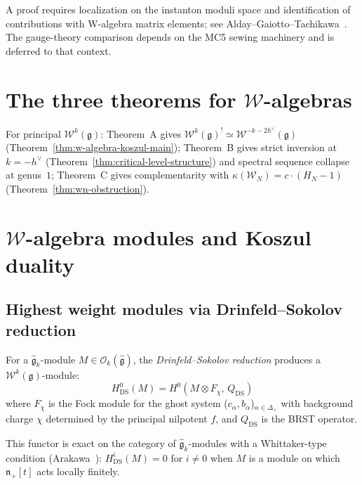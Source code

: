 \begin{remark}
A proof requires localization on the instanton moduli space and identification of contributions with W-algebra matrix elements; see Alday--Gaiotto--Tachikawa~\cite{AGT09}.  The gauge-theory comparison depends on the MC5 sewing machinery and is deferred to that context.
\end{remark}


\section{The three theorems for $\mathcal{W}$-algebras}

\begin{remark}
\label{rem:w-algebra-three-theorems}
For principal $\mathcal{W}^k(\mathfrak{g})$:
Theorem~A gives $\mathcal{W}^k(\mathfrak{g})^! \simeq \mathcal{W}^{-k-2h^\vee}(\mathfrak{g})$ (Theorem~\ref{thm:w-algebra-koszul-main});
Theorem~B gives strict inversion at $k = -h^\vee$ (Theorem~\ref{thm:critical-level-structure}) and spectral sequence collapse at genus~$1$;
Theorem~C gives complementarity with $\kappa(\mathcal{W}_N) = c \cdot (H_N - 1)$ (Theorem~\ref{thm:wn-obstruction}).
\end{remark}

\section{$\mathcal{W}$-algebra modules and Koszul duality}
\label{sec:w-algebra-modules}

\subsection{Highest weight modules via Drinfeld--Sokolov reduction}

\begin{definition}
\label{def:w-module-ds}
For a $\widehat{\mathfrak{g}}_k$-module $M \in
\mathcal{O}_k(\widehat{\mathfrak{g}})$, the
\emph{Drinfeld--Sokolov reduction} produces a
$\mathcal{W}^k(\mathfrak{g})$-module:
\[
H^0_{\mathrm{DS}}(M) = H^0(M \otimes F_{\chi},\, Q_{\mathrm{DS}})
\]
where $F_\chi$ is the Fock module for the ghost system
($c_\alpha, b_\alpha$)$_{\alpha \in \Delta_+}$ with background charge
$\chi$ determined by the principal nilpotent $f$, and
$Q_{\mathrm{DS}}$ is the BRST operator.

This functor is exact on the category of $\widehat{\mathfrak{g}}_k$-modules
with a Whittaker-type condition (Arakawa~\cite{Arakawa17}): $H^i_{\mathrm{DS}}(M)
= 0$ for $i \neq 0$ when $M$ is a module on which
$\mathfrak{n}_+[t]$ acts locally finitely.
\end{definition}

